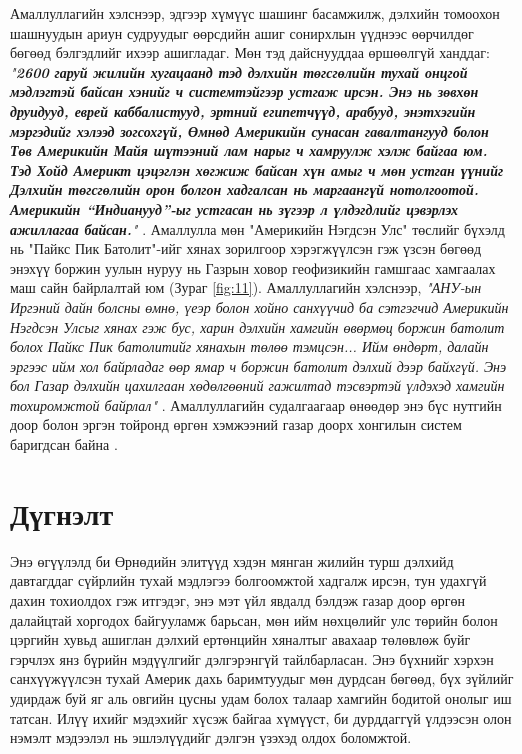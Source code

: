 \documentclass[10pt,twocolumn,letterpaper]{article}
\begin{document}
Амаллуллагийн хэлснээр, эдгээр хүмүүс шашинг басамжилж, дэлхийн томоохон шашнуудын ариун судруудыг өөрсдийн ашиг сонирхлын үүднээс өөрчилдөг бөгөөд бэлгэдлийг ихээр ашигладаг. Мөн тэд дайснууддаа өршөөлгүй ханддаг: \textit{"\textbf{2600 гаруй жилийн хугацаанд тэд дэлхийн төгсгөлийн тухай онцгой мэдлэгтэй байсан хэнийг ч системтэйгээр устгаж ирсэн. Энэ нь зөвхөн друидууд, еврей каббалистууд, эртний египетчүүд, арабууд, энэтхэгийн мэргэдийг хэлээд зогсохгүй, Өмнөд Америкийн сунасан гавалтангууд болон Төв Америкийн Майя шүтээний лам нарыг ч хамруулж хэлж байгаа юм. Тэд Хойд Америкт цэцэглэн хөгжиж байсан хүн амыг ч мөн устган үүнийг Дэлхийн төгсгөлийн орон болгон хадгалсан нь маргаангүй нотолгоотой. Америкийн “Индианууд”-ыг устгасан нь зүгээр л үлдэгдлийг цэвэрлэх ажиллагаа байсан.}"} \cite{33,34}.
Амаллулла мөн "Америкийн Нэгдсэн Улс" төслийг бүхэлд нь "Пайкс Пик Батолит"-ийг хянах зорилгоор хэрэгжүүлсэн гэж үзсэн бөгөөд энэхүү боржин уулын нуруу нь Газрын ховор геофизикийн гамшгаас хамгаалах маш сайн байрлалтай юм (Зураг \ref{fig:11}). Амаллуллагийн хэлснээр, \textit{"АНУ-ын Иргэний дайн болсны өмнө, үеэр болон хойно санхүүчид ба сэтгэгчид Америкийн Нэгдсэн Улсыг хянах гэж бус, харин дэлхийн хамгийн өвөрмөц боржин батолит болох Пайкс Пик батолитийг хянахын төлөө тэмцсэн... Ийм өндөрт, далайн эргээс ийм хол байрладаг өөр ямар ч боржин батолит дэлхий дээр байхгүй. Энэ бол Газар дэлхийн цахилгаан хөдөлгөөний гажилтад тэсвэртэй үлдэхэд хамгийн тохиромжтой байрлал"} \cite{33,34}. Амаллуллагийн судалгаагаар өнөөдөр энэ бүс нутгийн доор болон эргэн тойронд өргөн хэмжээний газар доорх хонгилын систем баригдсан байна \cite{36}.

\section{Дүгнэлт}

Энэ өгүүлэлд би Өрнөдийн элитүүд хэдэн мянган жилийн турш дэлхийд давтагддаг сүйрлийн тухай мэдлэгээ болгоомжтой хадгалж ирсэн, тун удахгүй дахин тохиолдох гэж итгэдэг, энэ мэт үйл явдалд бэлдэж газар доор өргөн далайцтай хоргодох байгууламж барьсан, мөн ийм нөхцөлийг улс төрийн болон цэргийн хувьд ашиглан дэлхий ертөнцийн хяналтыг авахаар төлөвлөж буйг гэрчлэх янз бүрийн мэдүүлгийг дэлгэрэнгүй тайлбарласан. Энэ бүхнийг хэрхэн санхүүжүүлсэн тухай Америк дахь баримтуудыг мөн дурдсан бөгөөд, бүх зүйлийг удирдаж буй яг аль овгийн цусны удам болох талаар хамгийн бодитой онолыг иш татсан. Илүү ихийг мэдэхийг хүсэж байгаа хүмүүст, би дурддаггүй үлдээсэн олон нэмэлт мэдээлэл нь эшлэлүүдийг дэлгэн үзэхэд олдох боломжтой.
\end{document}
